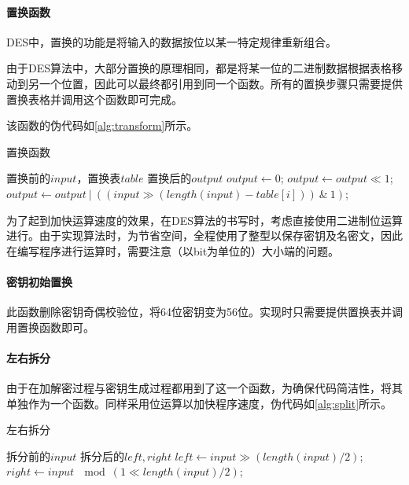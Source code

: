 \documentclass[a4paper, zihao=-4, UTF-8]{ctexart}
\begin{document}
                \paragraph{置换函数} DES中，置换的功能是将输入的数据按位以某一特定规律重新组合。
                \par 由于DES算法中，大部分置换的原理相同，都是将某一位的二进制数据根据表格移动到另一个位置，因此可以最终都引用到同一个函数。所有的置换步骤只需要提供置换表格并调用这个函数即可完成。
                \par 该函数的伪代码如\cref{alg:transform}所示。
                \begin{algorithm}[htbp]
                	\caption{置换函数}
                	\label{alg:transform}
                	\begin{algorithmic}[1]
                		\Require 置换前的$input$，置换表$table$
                		\Ensure 置换后的$output$
                		\State $output \gets 0$;
							\State $output \gets output\ll 1$;
							\State $output \gets output\ |\ ((input \gg (length(input) - table[i]))\ \&\ 1)$;
				  		\EndFor
                		\State {}
                		\EndFunction
                	\end{algorithmic}
                \end{algorithm}
            	\par 为了起到加快运算速度的效果，在DES算法的书写时，考虑直接使用二进制位运算进行。由于实现算法时，为节省空间，全程使用了整型以保存密钥及名密文，因此在编写程序进行运算时，需要注意（以bit为单位的）大小端的问题。
            	\paragraph{密钥初始置换} 此函数删除密钥奇偶校验位，将64位密钥变为56位。实现时只需要提供置换表并调用置换函数即可。
            	\paragraph{左右拆分} 由于在加解密过程与密钥生成过程都用到了这一个函数，为确保代码简洁性，将其单独作为一个函数。同样采用位运算以加快程序速度，伪代码如\cref{alg:split}所示。
            	\begin{algorithm}[htbp]
            		\caption{左右拆分}
            		\label{alg:split}
            		\begin{algorithmic}[1]
            			\Require 拆分前的$input$
            			\Ensure 拆分后的$left, right$
            			\State $left \gets input\gg(length(input) / 2)$;
            			\State $right \gets input\ \mod (1\ll length(input) / 2)$;
            			\State {}
            			\EndFunction
            		\end{algorithmic}
            	\end{algorithm}
\end{document}
